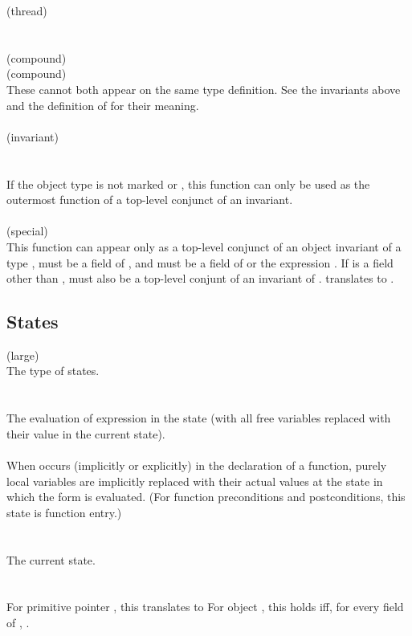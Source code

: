 \documentclass[preprint,nocopyrightspace]{sigplanconf}
\begin{document}
{{{ (thread)\\
\\\\
 (compound)\\
 (compound)\\
These cannot both appear on the same type definition. See the
invariants above and the definition of  for their meaning.
\\\\
\noindent{} (invariant)\\
\\\\
If the object type is not marked 
or , this function can only be used as the
outermost function of a top-level conjunct of an invariant.
\\\\
 (special)\\
This function can appear only as a top-level conjunct of an object
invariant of a type ,  must be a field of ,
and  must be a field of  or the expression 
\vcc{\this->\owner}. If  is a field other than \vcc{\owner}, 
 must also be a top-level conjunt of an invariant
of .  translates to
. 

\subsection{States}
\vcc{\state} (large)\\
The type of states. 
\\\\
\\
The evaluation of expression  in the state  (with all
free variables replaced with their value in the current state).  
\\\\
When \vcc{\at} occurs (implicitly or explicitly) in the declaration of
a function, purely local variables are implicitly replaced with their
actual values at the state in which the form is evaluated. (For
function preconditions and postconditions, this state is function entry.)
\\\\
\vcc{\state \now()}\\
The current state. 
\\\\
\\
For primitive pointer , this translates to  
For object , this holds iff, for every field 
of , .

}}}
\end{document}
